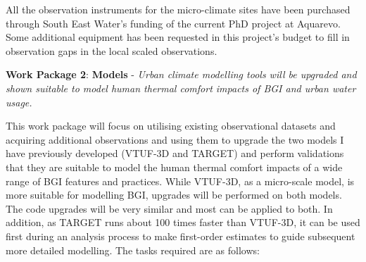  All the observation instruments for the micro-climate sites have been purchased through South East Water's funding of the current PhD project at Aquarevo. Some additional equipment has been requested in this project's budget to fill in observation gaps in the local scaled observations.




\textbf{Work Package 2}: \textbf{Models} - \emph{Urban climate modelling tools will be upgraded and shown suitable to model human thermal comfort impacts of BGI and urban water usage.  }

This work package will focus on utilising existing observational datasets and acquiring additional observations and using them to upgrade the two models I have previously developed (VTUF-3D and TARGET) and perform validations that they are suitable to model the human thermal comfort impacts of a wide range of BGI features and practices. While VTUF-3D, as a micro-scale model, is more suitable for modelling BGI, upgrades will be performed on both models. The code upgrades will be very similar and most can be applied to both. In addition, as TARGET runs about 100 times faster than VTUF-3D, it can be used first during an analysis process to make first-order estimates to guide subsequent more detailed modelling.  The tasks required are as follows:

